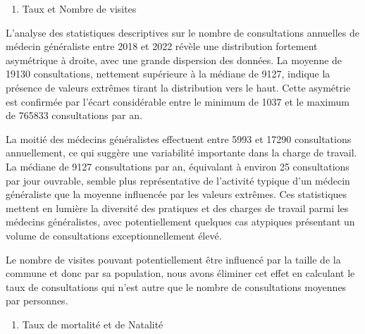 \documentclass[
]{article}
\providecommand{\tightlist}{%
  \setlength{\itemsep}{0pt}\setlength{\parskip}{0pt}}
\begin{document}
\begin{enumerate}
\def\labelenumi{\arabic{enumi}.}
\tightlist
\item
  Taux et Nombre de visites
\end{enumerate}

L'analyse des statistiques descriptives sur le nombre de consultations
annuelles de médecin généraliste entre 2018 et 2022 révèle une
distribution fortement asymétrique à droite, avec une grande dispersion
des données. La moyenne de 19130 consultations, nettement supérieure à
la médiane de 9127, indique la présence de valeurs extrêmes tirant la
distribution vers le haut. Cette asymétrie est confirmée par l'écart
considérable entre le minimum de 1037 et le maximum de 765833
consultations par an.

La moitié des médecins généralistes effectuent entre 5993 et 17290
consultations annuellement, ce qui suggère une variabilité importante
dans la charge de travail. La médiane de 9127 consultations par an,
équivalant à environ 25 consultations par jour ouvrable, semble plus
représentative de l'activité typique d'un médecin généraliste que la
moyenne influencée par les valeurs extrêmes. Ces statistiques mettent en
lumière la diversité des pratiques et des charges de travail parmi les
médecins généralistes, avec potentiellement quelques cas atypiques
présentant un volume de consultations exceptionnellement élevé.

Le nombre de visites pouvant potentiellement être influencé par la
taille de la commune et donc par sa population, nous avons éliminer cet
effet en calculant le taux de consultations qui n'est autre que le
nombre de consultations moyennes par personnes.

\begin{enumerate}
\def\labelenumi{\arabic{enumi}.}
\setcounter{enumi}{1}
\tightlist
\item
  Taux de mortalité et de Natalité
\end{enumerate}
\end{document}
